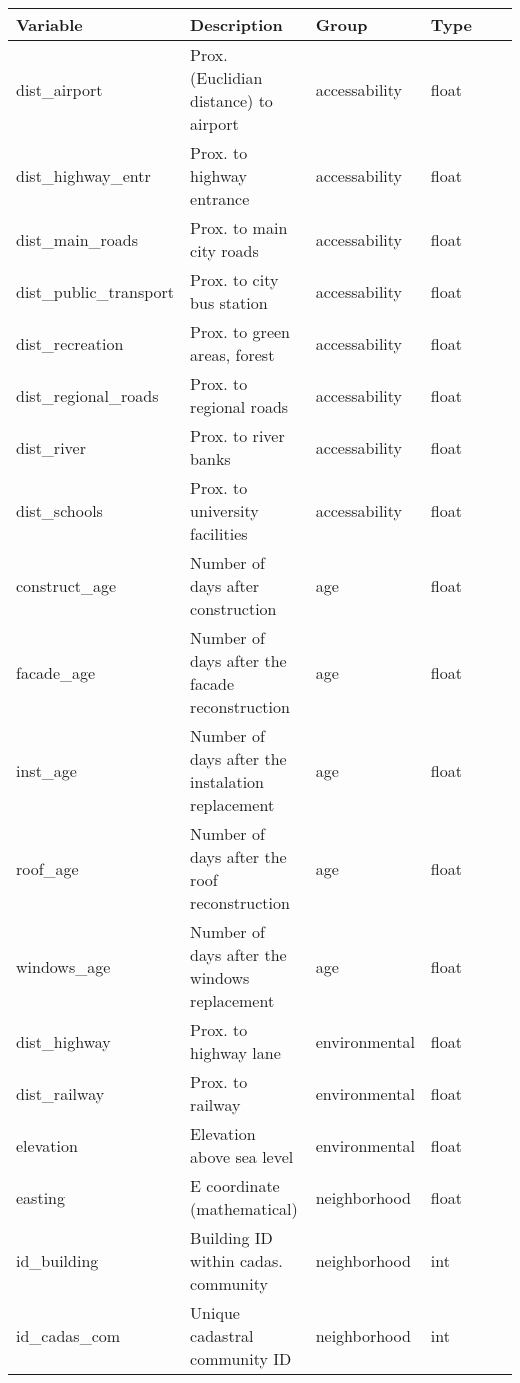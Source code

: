 \documentclass{article}
\begin{document}
  \begin{table}[!ht]
    \caption{Sample table title}
     \centering
     \begin{longtable}{p{}p{}p{}p{}p{}p{}}
       \toprule
       \textbf{Variable}  & \textbf{Description}     & \textbf{Group} & \textbf{Type} \\
       \midrule
        dist\_airport & Prox. (Euclidian distance) to airport & accessability & float \\
        dist\_highway\_entr & Prox. to highway entrance & accessability & float \\
        dist\_main\_roads & Prox. to main city roads & accessability & float \\
        dist\_public\_transport & Prox. to city bus station & accessability & float \\
        dist\_recreation & Prox. to green areas, forest & accessability & float \\
        dist\_regional\_roads & Prox. to regional roads & accessability & float \\
        dist\_river & Prox. to river banks & accessability & float \\
        dist\_schools & Prox. to university facilities & accessability & float \\
        construct\_age & Number of days after construction & age & float \\
        facade\_age & Number of days after the facade reconstruction & age & float \\
        inst\_age & Number of days after the instalation replacement & age & float \\
        roof\_age & Number of days after the roof reconstruction & age & float \\
        windows\_age & Number of days after the windows replacement & age & float \\
        dist\_highway & Prox. to highway lane & environmental & float \\
        dist\_railway & Prox. to railway & environmental & float \\
        elevation & Elevation above sea level & environmental & float \\
        easting & E coordinate (mathematical) & neighborhood & float \\
        id\_building & Building ID within cadas. community & neighborhood & int \\
        id\_cadas\_com & Unique cadastral community ID & neighborhood & int \\

\end{longtable}
\end{table}
\end{document}
